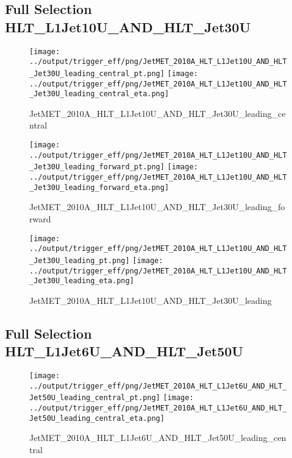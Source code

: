 \documentclass[11pt]{article}
\begin{document}
\newpage
\subsection{Full Selection HLT\_L1Jet10U\_AND\_HLT\_Jet30U}
\begin{figure}[ht]
\centering
\texttt{[image: ../output/trigger\_eff/png/JetMET\_2010A\_HLT\_L1Jet10U\_AND\_HLT\_Jet30U\_leading\_central\_pt.png]}
\texttt{[image: ../output/trigger\_eff/png/JetMET\_2010A\_HLT\_L1Jet10U\_AND\_HLT\_Jet30U\_leading\_central\_eta.png]}
\caption{JetMET\_2010A\_HLT\_L1Jet10U\_AND\_HLT\_Jet30U\_leading\_central}
\label{fig:jetmet_L1Jet10U_AND_HLT_Jet30U_leading_central}
\end{figure}

\begin{figure}[ht]
\centering
\texttt{[image: ../output/trigger\_eff/png/JetMET\_2010A\_HLT\_L1Jet10U\_AND\_HLT\_Jet30U\_leading\_forward\_pt.png]}
\texttt{[image: ../output/trigger\_eff/png/JetMET\_2010A\_HLT\_L1Jet10U\_AND\_HLT\_Jet30U\_leading\_forward\_eta.png]}
\caption{JetMET\_2010A\_HLT\_L1Jet10U\_AND\_HLT\_Jet30U\_leading\_forward}
\label{fig:jetmet_L1Jet10U_AND_HLT_Jet30U_leading_forward}
\end{figure}

\begin{figure}[ht]
\centering
\texttt{[image: ../output/trigger\_eff/png/JetMET\_2010A\_HLT\_L1Jet10U\_AND\_HLT\_Jet30U\_leading\_pt.png]}
\texttt{[image: ../output/trigger\_eff/png/JetMET\_2010A\_HLT\_L1Jet10U\_AND\_HLT\_Jet30U\_leading\_eta.png]}
\caption{JetMET\_2010A\_HLT\_L1Jet10U\_AND\_HLT\_Jet30U\_leading}
\label{fig:jetmet_L1Jet10U_AND_HLT_Jet30U_leading}
\end{figure}


\newpage
\subsection{Full Selection HLT\_L1Jet6U\_AND\_HLT\_Jet50U}
\begin{figure}[ht]
\centering
\texttt{[image: ../output/trigger\_eff/png/JetMET\_2010A\_HLT\_L1Jet6U\_AND\_HLT\_Jet50U\_leading\_central\_pt.png]}
\texttt{[image: ../output/trigger\_eff/png/JetMET\_2010A\_HLT\_L1Jet6U\_AND\_HLT\_Jet50U\_leading\_central\_eta.png]}
\caption{JetMET\_2010A\_HLT\_L1Jet6U\_AND\_HLT\_Jet50U\_leading\_central}
\label{fig:jetmet_L1Jet6U_AND_HLT_Jet50U_leading_central}
\end{figure}
\end{document}
